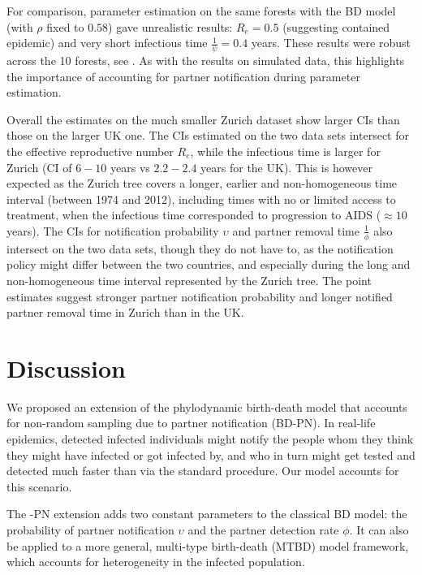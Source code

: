 \documentclass[10pt,letterpaper]{article}
\begin{document}
For comparison, parameter estimation on the same forests with the BD model (with $\rho$ fixed to $0.58$) gave unrealistic results: $R_e = 0.5$ (suggesting contained epidemic) and very short infectious time $\frac{1}{\psi} = 0.4$ years. These results were robust across the 10 forests, see . As with the results on simulated data, this  highlights the importance of accounting for partner notification during parameter estimation.

\bigskip

Overall the estimates on the much smaller Zurich dataset show larger CIs than those on the larger UK one. The CIs estimated on the two data sets intersect for the effective reproductive number $R_e$, while the infectious time is larger for Zurich (CI of $6-10$ years vs $2.2-2.4$ years for the UK). This is however expected as the Zurich tree covers a longer, earlier and non-homogeneous time interval (between 1974 and 2012), including times with no or limited access to treatment, when the infectious time corresponded to progression to AIDS ($\approx 10$ years). The CIs for notification probability $\upsilon$ and partner removal time $\frac{1}{\phi}$ also intersect on the two data sets, though they do not have to, as the notification policy might differ between the two countries, and especially during the long and non-homogeneous time interval represented by the Zurich tree. The point estimates suggest stronger partner notification probability and longer notified partner removal time in Zurich than in the UK.




\section*{Discussion}
We proposed an extension of the phylodynamic birth-death model that accounts for non-random sampling due to partner notification (BD-PN). In real-life epidemics, detected infected individuals might notify the people whom they think they might have infected or got infected by, and who in turn might get tested and detected much faster than via the standard procedure. Our model accounts for this scenario.

The -PN extension adds two constant parameters to the classical BD model: the probability of partner notification $\upsilon$ and the partner detection rate $\phi$. It can also be applied to a more general, multi-type birth-death (MTBD) model framework, which accounts for heterogeneity in the infected population. 
\end{document}
